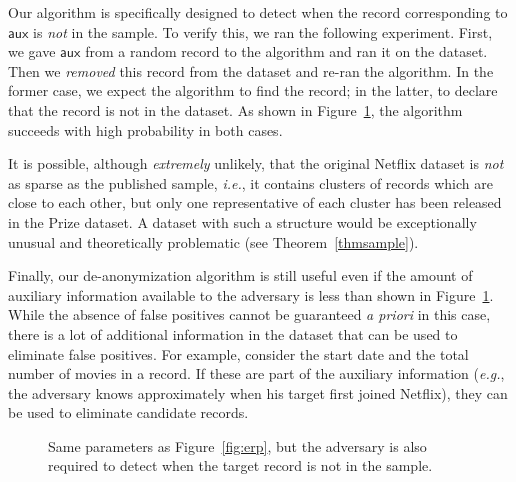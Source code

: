 \documentclass[11pt]{article}
\newcommand{\ie}{\emph{i.e.}}
\newcommand{\eg}{\emph{e.g.}}
\newcommand{\aux}{\textsf{aux}}
\begin{document}
Our algorithm is specifically designed to detect when the record
corresponding to $\aux$ is \emph{not} in the sample.  To verify this, we
ran the following experiment.  First, we gave $\aux$ from a random record
to the algorithm and ran it on the dataset.  Then we \emph{removed} this
record from the dataset and re-ran the algorithm.  In the former case,
we expect the algorithm to find the record; in the latter, to declare
that the record is not in the dataset.  As shown in Figure~\ref{fig:eqp},
the algorithm succeeds with high probability in both cases.

It is possible, although \emph{extremely} unlikely, that the original
Netflix dataset is \emph{not} as sparse as the published sample, \ie, it
contains clusters of records which are close to each other, but only one
representative of each cluster has been released in the Prize dataset.
A dataset with such a structure would be exceptionally unusual and
theoretically problematic (see Theorem~\ref{thmsample}).

Finally, our de-anonymization algorithm is still useful even if the amount
of auxiliary information available to the adversary is less than shown
in Figure~\ref{fig:eqp}.  While the absence of false positives cannot
be guaranteed \emph{a priori} in this case, there is a lot of additional
information in the dataset that can be used to eliminate false positives.
For example, consider the start date and the total number of movies in
a record.  If these are part of the auxiliary information (\eg, the
adversary knows approximately when his target first joined Netflix),
they can be used to eliminate candidate records.

\begin{figure}
\begin{minipage}[b]{0.47\linewidth} %
\centering
\mbox{}
\caption{De-anonymization: adversary knows exact ratings and approximate
dates.\label{fig:erp}}
\end{minipage}
\hspace{.5cm} %
\begin{minipage}[b]{0.47\linewidth}
\centering
\mbox{}
\caption{Same parameters as Figure~\ref{fig:erp}, but the adversary
is also required to detect when the target record is not in the
sample.\label{fig:eqp}}
\end{minipage}
\end{figure}
\end{document}
